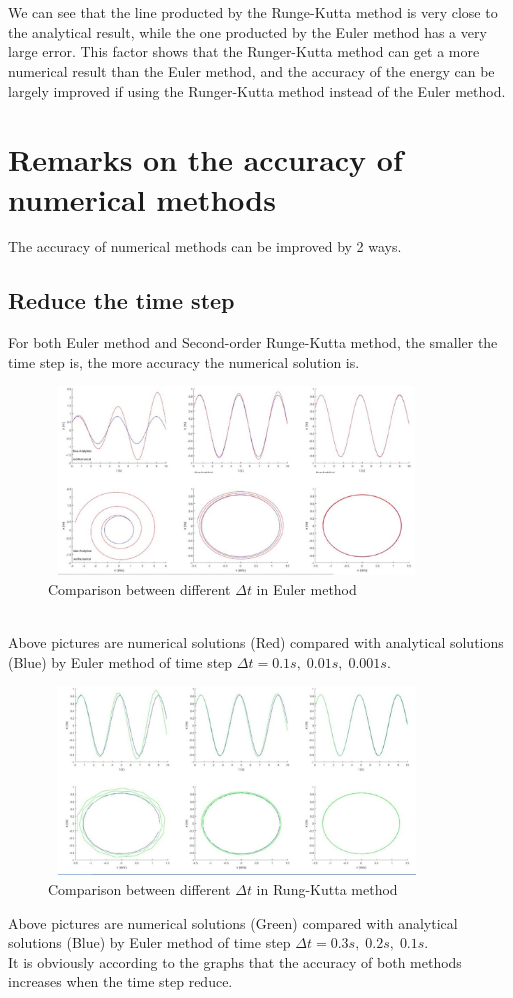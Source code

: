 \documentclass{article}
\begin{document}
\\
\\\indent We can see that the line producted by the Runge-Kutta method is very close to the analytical result, while the one producted by the Euler method has a very large error. This factor shows that the Runger-Kutta method can get a more numerical result than the Euler method, and the accuracy of the energy can be largely improved if using the Runger-Kutta method instead of the Euler method.
\section{Remarks on the accuracy of numerical methods}
The accuracy of numerical methods can be improved by 2 ways.
\subsection{Reduce the time step}
For both Euler method and Second-order Runge-Kutta method, the smaller the time step is, the more accuracy the numerical solution is.
\begin{figure}[!htb]
	\begin{center}
		\includegraphics[height=5cm,width=10cm]{Section4}
	\end{center}
	\caption{Comparison between different $\Delta t$ in Euler method}
\end{figure}
\\Above pictures are numerical solutions (Red) compared with analytical solutions (Blue) by Euler method of time step $\Delta t=0.1s,\;0.01s,\;0.001s.$
\newpage
\begin{figure}[!htb]
	\begin{center}
		\includegraphics[height=5cm,width=10cm]{Section4_2}
	\end{center}
	\caption{Comparison between different $\Delta t$ in Rung-Kutta method}
\end{figure}
\noindent Above pictures are numerical solutions (Green) compared with analytical solutions (Blue) by Euler method of time step $\Delta t=0.3s,\;0.2s,\;0.1s.$
\\It is obviously according to the graphs that the accuracy of both methods increases when the time step reduce.
\end{document}
